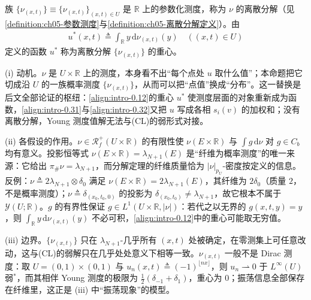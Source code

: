 \documentclass[../main.tex]{subfiles}
\begin{document}
族 $\{\nu_{(x,t)}\}\equiv\{\nu_{(x,t)}\}_{(x,t)\in U}$ 是 $\mathbb{R}$ 上的参数化测度，称为 $\nu$ 的离散分解（见\cref{definition:ch05-参数测度}与\cref{definition:ch05-离散分解定义}）。由
\begin{align}
u^*(x,t) \triangleq  \int_{\mathbb{R}}y\,\mathrm{d}\nu_{(x,t)}(y) \quad ((x,t)\in U) \label{align:intro-0.12}
\end{align}
定义的函数 $u^*$ 称为离散分解 $\{\nu_{(x,t)}\}$ 的重心。

\begin{remark}\label{remark:intro-0.2.1-动机}
(i) 动机。$\nu$ 是 $U\times\mathbb{R}$ 上的测度，本身看不出“每个点处 $u$ 取什么值”；本命题把它切成沿 $U$ 的一族概率测度 $\{\nu_{(x,t)}\}$，从而可以把“点值”换成“分布”。这一替换是后文全部论证的枢纽：\eqref{align:intro-0.12}的重心 $u^*$ 使测度层面的对象重新成为函数，\eqref{align:intro-0.31}与\eqref{align:intro-0.32}又把 $u$ 写成各相 $s_i(v)$ 的加权和；没有离散分解，Young 测度值解无法与(CL)的弱形式对接。

(ii) 各假设的作用。$\nu\in\mathscr{R}^+_f(U\times\mathbb{R})$ 的有限性使 $\nu(E\times\mathbb{R})$ 与 $\int g\,\mathrm{d}\nu$ 对 $g\in C_b$ 均有意义。投影恒等式 $\nu(E\times\mathbb{R})=\lambda_{N+1}(E)$ 是“纤维为概率测度”的唯一来源：它给出 $\pi_\#\nu=\lambda_{N+1}$，而分解定理的纤维质量恰为 $|\nu|_{p_U}$-密度按定义的信息。反例：$\nu\triangleq 2\lambda_{N+1}\otimes\delta_0$ 满足 $\nu(E\times\mathbb{R})=2\lambda_{N+1}(E)$，其纤维为 $2\delta_0$（质量 $2$，不是概率测度）；$\nu\triangleq\delta_{(x_0,t_0,0)}$ 的投影为 $\delta_{(x_0,t_0)}\neq\lambda_{N+1}$，故它根本不属于 $\mathcal{Y}(U;\mathbb{R})$。$g$ 的有界性保证 $g\in L^1(U\times\mathbb{R},|\nu|)$：若代之以无界的 $g(x,t,y)=y$，则 $\int_{\mathbb{R}}y\,\mathrm{d}\nu_{(x,t)}(y)$ 不必可积，\eqref{align:intro-0.12}中的重心可能取无穷值。

(iii) 边界。$\{\nu_{(x,t)}\}$ 只在 $\lambda_{N+1}$-几乎所有 $(x,t)$ 处被确定，在零测集上可任意改动，这与(CL)的弱解只在几乎处处意义下相等一致。$\nu_{(x,t)}$ 一般不是 Dirac 测度：取 $U=(0,1)\times(0,1)$ 与 $u_n(x,t)\triangleq(-1)^{\lfloor nx\rfloor}$，则 $u_n\rightharpoonup0$ 于 $L^\infty(U)$ 弱$^*$，而其相伴 Young 测度的极限为 $\tfrac12(\delta_{-1}+\delta_1)$，重心为 $0$；振荡信息全部保存在纤维里，这正是 (iii) 中“振荡现象”的模型。
\end{remark}
\end{document}
